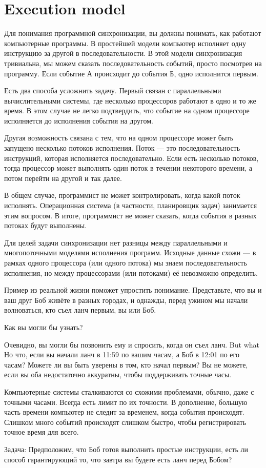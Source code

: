 \section {Execution model}

Для понимания программной синхронизации, вы должны понимать,
как работают компьютерные программы.
В простейшей модели компьютер исполняет одну инструкцию
за другой в последовательности.
В этой модели синхронизация тривиальна, мы можем сказать
последовательность событий, просто посмотрев на программу.
Если событие А происходит до события Б, одно исполнится первым.

Есть два способа усложнить задачу.
Первый связан с  параллельными вычислительными системы, где
несколько процессоров работают в одно и то же время.
В этом случае не легко подтвердить, что событие на одном процессоре
исполняется до исполнения события на другом.

Другая возможность связана с тем, что на одном процессоре может
быть запущено несколько потоков исполнения.
Поток --- это последовательность инструкций, которая исполняется последовательно.
Если есть несколько потоков, тогда процессор может выполнять один поток в 
течении некоторого времени, а потом перейти на другой и так далее.

В общем случае, программист не может контролировать,
когда какой поток исполнять.
Операционная система (в частности, планировщик задач) занимается этим вопросом.
В итоге, программист не может сказать,
когда события в разных потоках будут выполнены.

Для целей задачи синхронизации нет разницы между параллельными и многопоточными
моделями исполнения программ.
Исходные данные схожи --- в рамках одного процессора (или одного потока) мы 
знаем последовательность исполнения, но между процессорами (или потоками) её
невозможно определить.

Пример из реальной жизни поможет упростить понимание.
Представьте, что вы и ваш друг Боб живёте в разных городах, и однажды, перед
ужином мы начали волноваться, кто съел ланч первым, вы или Боб.

Как вы могли бы узнать?

Очевидно, вы могли бы позвонить ему и спросить, когда он съел ланч.
But what
Но что, если вы начали ланч в 11:59 по вашим часам, а Боб в 12:01 по его часам?
Можете ли вы быть уверены в том, кто начал первым?
Вы не можете,
если вы оба недостаточно аккуратны, чтобы поддерживать точные часы.

Компьютерные системы сталкиваются со схожими проблемами, обычно,
даже с точными часами. Всегда есть лимит по их точности.
В дополнение, большую часть времени компьютер не следит за временем, когда
события происходят.
Слишком много событий происходят слишком быстро, чтобы регистрировать точное
время для всего.

Задача: Предположим, что Боб готов выполнить простые инструкции, есть ли
способ гарантирующий то, что завтра вы будете есть ланч перед Бобом?

\clearemptydoublepage
